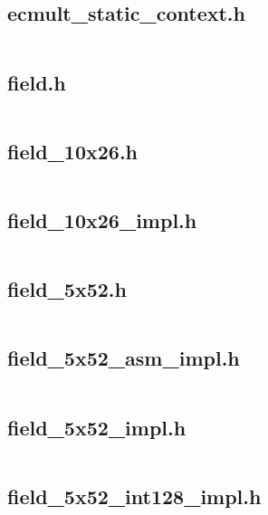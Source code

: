 \documentclass{article}
\begin{document}
\subsection{ecmult\_static\_context.h}
\inputminted{cpp}{/home/dufferzafar/dev/@clones/bitcoin/src/secp256k1/src/ecmult_static_context.h}
\newpage

\subsection{field.h}
\inputminted{cpp}{/home/dufferzafar/dev/@clones/bitcoin/src/secp256k1/src/field.h}
\newpage

\subsection{field\_10x26.h}
\inputminted{cpp}{/home/dufferzafar/dev/@clones/bitcoin/src/secp256k1/src/field_10x26.h}
\newpage

\subsection{field\_10x26\_impl.h}
\inputminted{cpp}{/home/dufferzafar/dev/@clones/bitcoin/src/secp256k1/src/field_10x26_impl.h}
\newpage

\subsection{field\_5x52.h}
\inputminted{cpp}{/home/dufferzafar/dev/@clones/bitcoin/src/secp256k1/src/field_5x52.h}
\newpage

\subsection{field\_5x52\_asm\_impl.h}
\inputminted{cpp}{/home/dufferzafar/dev/@clones/bitcoin/src/secp256k1/src/field_5x52_asm_impl.h}
\newpage

\subsection{field\_5x52\_impl.h}
\inputminted{cpp}{/home/dufferzafar/dev/@clones/bitcoin/src/secp256k1/src/field_5x52_impl.h}
\newpage

\subsection{field\_5x52\_int128\_impl.h}
\inputminted{cpp}{/home/dufferzafar/dev/@clones/bitcoin/src/secp256k1/src/field_5x52_int128_impl.h}
\newpage
\end{document}
